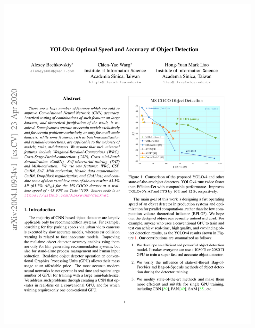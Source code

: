 

{\centering
\vspace{-5ex}
\includegraphics[width=\textwidth, page=1, trim = 15mm 20mm 15mm 20mm]{pdfs/外文翻译YOLOv4原文.pdf}
}
